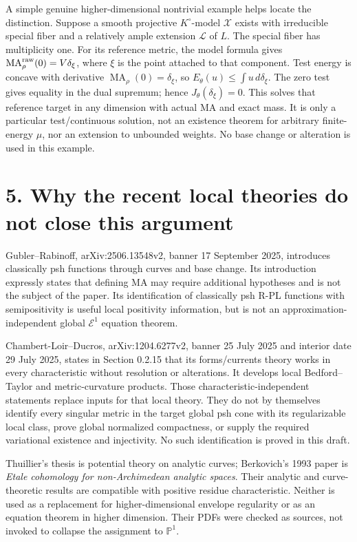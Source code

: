 \documentclass[
  11pt,
]{article}
\begin{document}
A simple genuine higher-dimensional nontrivial example helps locate the
distinction. Suppose a smooth projective \(K^\circ\)-model
\(\mathcal X\) exists with irreducible special fiber and a relatively
ample extension \(\mathcal L\) of \(L\). The special fiber has
multiplicity one. For its reference metric, the model formula gives
\(\operatorname{MA}^{\rm raw}_\rho(0)=V\delta_\xi\), where \(\xi\) is
the point attached to that component. Test energy is concave with
derivative \(\operatorname{MA}_\rho(0)=\delta_\xi\), so
\(E_\theta(u)\leq\int u\,d\delta_\xi\). The zero test gives equality in
the dual supremum; hence \(J_\theta(\delta_\xi)=0\). This solves that
reference target in any dimension with actual MA and exact mass. It is
only a particular test/continuous solution, not an existence theorem for
arbitrary finite-energy \(\mu\), nor an extension to unbounded weights.
No base change or alteration is used in this example.

\section{5. Why the recent local theories do not close this
argument}\label{why-the-recent-local-theories-do-not-close-this-argument}

Gubler--Rabinoff, arXiv:2506.13548v2, banner 17 September 2025,
introduces classically psh functions through curves and base change. Its
introduction expressly states that defining MA may require additional
hypotheses and is not the subject of the paper. Its identification of
classically psh R-PL functions with semipositivity is useful local
positivity information, but is not an approximation-independent global
\(\mathcal E^1\) equation theorem.

Chambert-Loir--Ducros, arXiv:1204.6277v2, banner 25 July 2025 and
interior date 29 July 2025, states in Section 0.2.15 that its
forms/currents theory works in every characteristic without resolution
or alterations. It develops local Bedford--Taylor and metric-curvature
products. Those characteristic-independent statements replace inputs for
that local theory. They do not by themselves identify every singular
metric in the target global psh cone with its regularizable local class,
prove global normalized compactness, or supply the required variational
existence and injectivity. No such identification is proved in this
draft.

Thuillier's thesis is potential theory on analytic curves; Berkovich's
1993 paper is \emph{Etale cohomology for non-Archimedean analytic
spaces}. Their analytic and curve-theoretic results are compatible with
positive residue characteristic. Neither is used as a replacement for
higher-dimensional envelope regularity or as an equation theorem in
higher dimension. Their PDFs were checked as sources, not invoked to
collapse the assignment to \(\mathbb P^1\).
\end{document}
